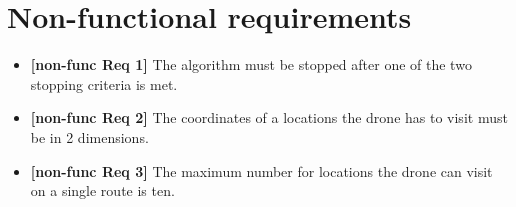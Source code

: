 \section{Non-functional requirements}
\begin{itemize}
	\item \textbf{[non-func Req 1]} The algorithm must be stopped after one of the two stopping 
	criteria is met. 
	\item \textbf{[non-func Req 2]} The coordinates of a locations the drone has to visit must be in 2 dimensions.  
	\item \textbf{[non-func Req 3]} The maximum number for locations the drone can visit on a single route is ten.
\end{itemize}